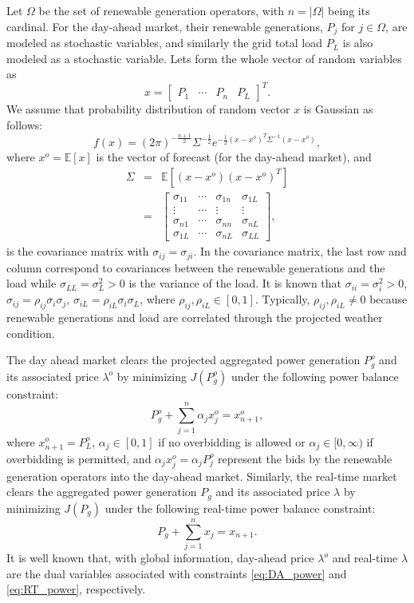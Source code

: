 \documentclass[conference]{IEEEtran}
\begin{document}
Let $\Omega$ be the set of renewable generation operators, with $n=|\Omega|$ being its cardinal. For the day-ahead market, their renewable generations, $P_j$ for $j\in\Omega$, are modeled as stochastic variables, and similarly the grid total load $P_L$ is also modeled as a stochastic variable. Lets form the whole vector of random variables as 
\begin{equation} 
x = \begin{bmatrix} P_1 & \cdots & P_n & P_L \end{bmatrix}^T.  \label{eq:x}
\end{equation}
We assume that probability distribution of random vector $x$ is Gaussian as follows:
\[ f(x) = (2\pi)^{-\frac{n+1}{2}}\Sigma^{-\frac{1}{2}} e^{-\frac{1}{2}(x-x^o)^T\Sigma^{-1}(x-x^o)},  \]
where  $x^o=\mathbb{E}[x]$ is the vector of forecast (for the day-ahead market), and 
\begin{eqnarray*}
\Sigma & = & \mathbb{E}[(x-x^o)(x-x^o)^T] \\
& = & \begin{bmatrix} \sigma_{11} & \cdots & \sigma_{1n} & \sigma_{1L} \\ \vdots & \cdots & \vdots & \vdots \\ \sigma_{n1} & \cdots & \sigma_{nn} & \sigma_{nL} \\ \sigma_{1L} & \cdots & \sigma_{nL} & \sigma_{LL}
\end{bmatrix},  
\end{eqnarray*}
is the covariance matrix with $\sigma_{ij}=\sigma_{ji}$. In the covariance matrix, the last row and column correspond to covariances between the renewable generations and the load while $\sigma_{LL}=\sigma_L^2>0$ is the variance of the load. It is known that 
$\sigma_{ii}=\sigma_i^2>0$, $\sigma_{ij}=\rho_{ij}\sigma_i\sigma_j$, $\sigma_{iL}=\rho_{iL}\sigma_i\sigma_L$, where $\rho_{ij},\rho_{iL}\in[0,1]$. Typically, $\rho_{ij},\rho_{iL}\not=0$ because renewable generations and load are correlated through the projected weather condition. 

The day ahead market clears the projected aggregated power generation $P_g^o$ and its associated price $\lambda^o$ by minimizing $J(P_g^o)$ under the following power balance constraint:
\begin{equation} 
P_g^o + \sum_{j=1}^n \alpha_j x_j^o  = x_{n+1}^o, \label{eq:DA_power}
\end{equation}
where $x_{n+1}^o=P_L^o$, $\alpha_j\in[0,1]$ if no overbidding is allowed or $\alpha_j\in[0,\infty)$ if overbidding is permitted, and $\alpha_j x_j^o =\alpha_j P_j^o$ represent the bids by the renewable generation operators into the day-ahead market. Similarly, the real-time market clears the aggregated power generation $P_g$ and its associated price $\lambda$ by minimizing $J(P_g)$ under the following real-time power balance constraint:
\begin{equation} 
P_g + \sum_{j=1}^n x_j   = x_{n+1}. \label{eq:RT_power}
\end{equation}
It is well known that, with global information, day-ahead price $\lambda^o$ and real-time $\lambda$ are the dual variables associated with constraints \eqref{eq:DA_power} and \eqref{eq:RT_power}, respectively. 
\end{document}
